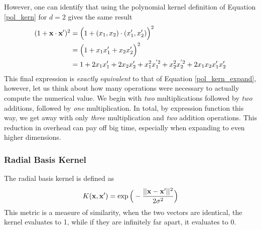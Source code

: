However, one can identify that using the polynomial kernel definition of Equation \ref{pol_kern} for $d=2$ gives the same result
\begin{align}
	(1+ \textbf{x}\cdot \textbf{x}')^2 &= \Big(1+(x_1,x_2)\cdot(x_1',x_2')\Big)^2\\
	&= \Big(1+x_1x_1'+x_2x_2'\Big)^2\\
	&= 1 + 2x_1x_1' + 2x_2x_2' + x_1^2x_1^{'2}+x_2^2x_2^{'2} + 2x_1x_2x_1'x_2'
\end{align}
This final expression is \emph{exactly equivalent} to that of Equation \ref{pol_kern_expand}, however, let us think about how many operations were necessary to actually compute the numerical value. We begin with \emph{two} multiplications followed by \emph{two} additions, followed by \emph{one} multiplication. In total, by expression function this way, we get away with only \emph{three} multiplication and \emph{two} addition operations. This reduction in overhead can pay off big time, especially when expanding to even higher dimensions.

\subsubsection{Radial Basis Kernel}
The radial basis kernel is defined as 
\begin{align}
		K(\textbf{x},\textbf{x}') = \exp\Big(-\frac{||\textbf{x}-\textbf{x}'||^2}{2\sigma^2}\Big)
\end{align}
This metric is a measure of similarity, when the two vectors are identical, the kernel evaluates to 1, while if they are infinitely far apart, it evaluates to 0.


